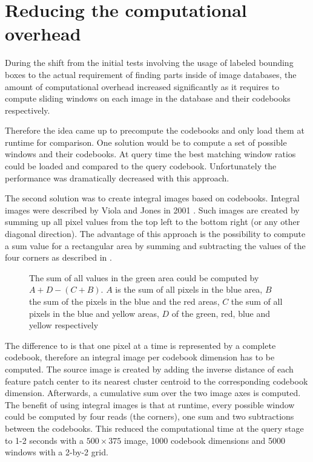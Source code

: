 \section{Reducing the computational overhead}

During the shift from the initial tests involving the usage of labeled bounding boxes to the actual requirement of finding parts inside of image databases, the amount of computational overhead increased significantly as it requires to compute sliding windows on each image in the database and their codebooks respectively.

Therefore the idea came up to precompute the codebooks and only load them at runtime for comparison. One solution would be to compute a set of possible windows and their codebooks. At query time the best matching window ratios could be loaded and compared to the query codebook. Unfortunately the performance was dramatically decreased with this approach.

The second solution was to create integral images based on codebooks. Integral images were described by Viola and Jones in 2001 \cite{viola2001rapid}. Such images are created by summing up all pixel values from the top left to the bottom right (or any other diagonal direction). The advantage of this approach is the possibility to compute a sum value for a rectangular area by summing and subtracting the values of the four corners as described in . 

\begin{figure}
\caption[Sum of area in integral image]{The sum of all values in the green area could be computed by $A+D-(C+B)$. $A$ is the sum of all pixels in the blue area, $B$ the sum of the pixels in the blue and the red areas, $C$ the sum of all pixels in the blue and yellow areas, $D$ of the green, red, blue and yellow respectively}
\label{fig:integral_image}
\end{figure}

The difference to \cite{viola2001rapid} is that one pixel at a time is represented by a complete codebook, therefore an integral image per codebook dimension has to be computed. The source image is created by adding the inverse distance of each feature patch center to its nearest cluster centroid to the corresponding codebook dimension. Afterwards, a cumulative sum over the two image axes is computed. The benefit of using integral images is that at runtime, every possible window could be computed by four reads (the corners), one sum and two subtractions between the codebooks. This reduced the computational time at the query stage to 1-2 seconds with a $500\times375$ image, 1000 codebook dimensions and 5000 windows with a 2-by-2 grid.

